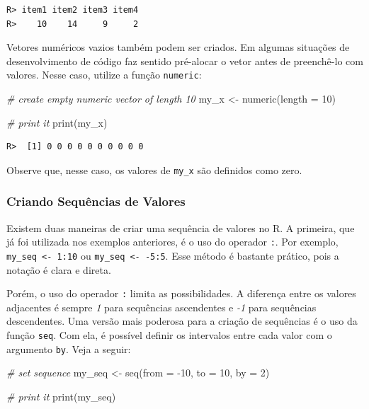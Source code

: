 \documentclass[
  11pt,
]{book}
\newenvironment{Shaded}{\begin{snugshade}}{\end{snugshade}}
\newcommand{\AttributeTok}[1]{\textcolor[rgb]{0.61,0.61,0.61}{#1}}
\newcommand{\CommentTok}[1]{\textcolor[rgb]{0.37,0.37,0.37}{\textit{#1}}}
\newcommand{\DecValTok}[1]{\textcolor[rgb]{0.06,0.06,0.06}{#1}}
\newcommand{\FunctionTok}[1]{\textcolor[rgb]{0,0,0}{#1}}
\newcommand{\NormalTok}[1]{#1}
\newcommand{\OtherTok}[1]{\textcolor[rgb]{0.37,0.37,0.37}{#1}}
\newcommand{\SpecialCharTok}[1]{\textcolor[rgb]{0,0,0}{#1}}
\begin{document}
\begin{verbatim}
R> item1 item2 item3 item4 
R>    10    14     9     2
\end{verbatim}

Vetores numéricos vazios também podem ser criados. Em algumas situações de desenvolvimento de código faz sentido pré-alocar o vetor antes de preenchê-lo com valores. Nesse caso, utilize a função \texttt{numeric}:

\begin{Shaded}
\begin{Highlighting}[]
\CommentTok{\# create empty numeric vector of length 10}
\NormalTok{my\_x }\OtherTok{\textless{}{-}} \FunctionTok{numeric}\NormalTok{(}\AttributeTok{length =} \DecValTok{10}\NormalTok{)}

\CommentTok{\# print it}
\FunctionTok{print}\NormalTok{(my\_x)}
\end{Highlighting}
\end{Shaded}

\begin{verbatim}
R>  [1] 0 0 0 0 0 0 0 0 0 0
\end{verbatim}

Observe que, nesse caso, os valores de \texttt{my\_x} são definidos como zero.

\hypertarget{criando-sequuxeancias-de-valores}{%
\subsubsection{Criando Sequências de Valores}\label{criando-sequuxeancias-de-valores}}

Existem duas maneiras de criar uma sequência de valores no R. A primeira, que já foi utilizada nos exemplos anteriores, é o uso do operador \texttt{:}. Por exemplo, \texttt{my\_seq\ \textless{}-\ 1:10} ou \texttt{my\_seq\ \textless{}-\ -5:5}. Esse método é bastante prático, pois a notação é clara e direta.

Porém, o uso do operador \texttt{:} limita as possibilidades. A diferença entre os valores adjacentes é sempre \emph{1} para sequências ascendentes e \emph{-1} para sequências descendentes. Uma versão mais poderosa para a criação de sequências é o uso da função \texttt{seq}. Com ela, é possível definir os intervalos entre cada valor com o argumento \texttt{by}. Veja a seguir: 

\begin{Shaded}
\begin{Highlighting}[]
\CommentTok{\# set sequence}
\NormalTok{my\_seq }\OtherTok{\textless{}{-}} \FunctionTok{seq}\NormalTok{(}\AttributeTok{from =} \SpecialCharTok{{-}}\DecValTok{10}\NormalTok{, }\AttributeTok{to =} \DecValTok{10}\NormalTok{, }\AttributeTok{by =} \DecValTok{2}\NormalTok{)}

\CommentTok{\# print it}
\FunctionTok{print}\NormalTok{(my\_seq)}
\end{Highlighting}
\end{Shaded}
\end{document}
